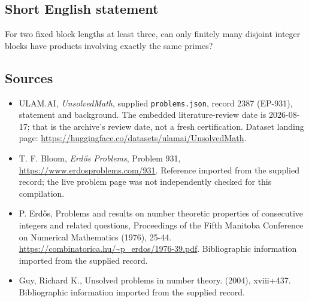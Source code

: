 \documentclass[11pt,a4paper]{article}
\begin{document}
\subsection{Short English statement}

For two fixed block lengths at least three, can only finitely many disjoint integer blocks have products involving exactly the same primes?

\subsection{Sources}

{\small

\begin{itemize}

\item[\hypertarget{source:2387:1}{S1}] ULAM.AI, \emph{UnsolvedMath}, supplied \texttt{problems.json}, record 2387 (EP-931), statement and background. The embedded literature-review date is 2026-08-17; that is the archive’s review date, not a fresh certification. Dataset landing page: \url{https://huggingface.co/datasets/ulamai/UnsolvedMath}.

\item[\hypertarget{source:2387:2}{S2}] T. F. Bloom, \emph{Erdős Problems}, Problem 931, \url{https://www.erdosproblems.com/931}. Reference imported from the supplied record; the live problem page was not independently checked for this compilation.

\item[\hypertarget{source:2387:3}{S3}] P. Erdős, Problems and results on number theoretic properties of consecutive integers and related questions, Proceedings of the Fifth Manitoba Conference on Numerical Mathematics (1976), 25-44. \url{https://combinatorica.hu/~p_erdos/1976-39.pdf}. Bibliographic information imported from the supplied record.

\item[\hypertarget{source:2387:4}{S4}] Guy, Richard K., Unsolved problems in number theory. (2004), xviii+437. Bibliographic information imported from the supplied record.

\end{itemize}

}

\label{end:2387}
\end{document}
